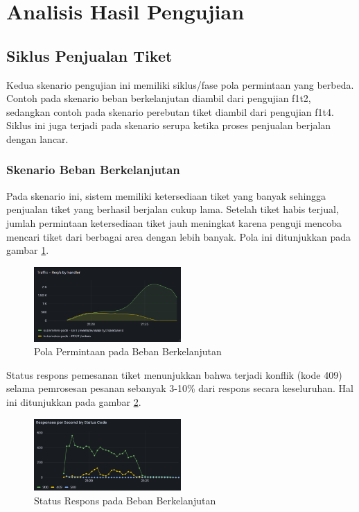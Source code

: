 \section{Analisis Hasil Pengujian}

\subsection{Siklus Penjualan Tiket}

Kedua skenario pengujian ini memiliki siklus/fase pola permintaan yang berbeda. Contoh pada skenario beban berkelanjutan diambil dari pengujian f1t2, sedangkan contoh pada skenario perebutan tiket diambil dari pengujian f1t4. Siklus ini juga terjadi pada skenario serupa ketika proses penjualan berjalan dengan lancar.

\subsubsection{Skenario Beban Berkelanjutan}

Pada skenario ini, sistem memiliki ketersediaan tiket yang banyak sehingga penjualan tiket yang berhasil berjalan cukup lama. Setelah tiket habis terjual, jumlah permintaan ketersediaan tiket jauh meningkat karena penguji mencoba mencari tiket dari berbagai area dengan lebih banyak. Pola ini ditunjukkan pada gambar \ref{fig:pattern-stress-traffic}.

\begin{figure}[htbp]
    \centering
    \includegraphics[width=0.5\textwidth]{resources/chapter-4/pattern-stress-traffic.png}
    \caption{Pola Permintaan pada Beban Berkelanjutan}
    \label{fig:pattern-stress-traffic}
\end{figure}

Status respons pemesanan tiket menunjukkan bahwa terjadi konflik (kode 409) selama pemrosesan pesanan sebanyak 3-10\% dari respons secara keseluruhan. Hal ini ditunjukkan pada gambar \ref{fig:pattern-stress-order}.

\begin{figure}[htbp]
    \centering
    \includegraphics[width=0.5\textwidth]{resources/chapter-4/pattern-stress-order.png}
    \caption{Status Respons pada Beban Berkelanjutan}
    \label{fig:pattern-stress-order}
\end{figure}

